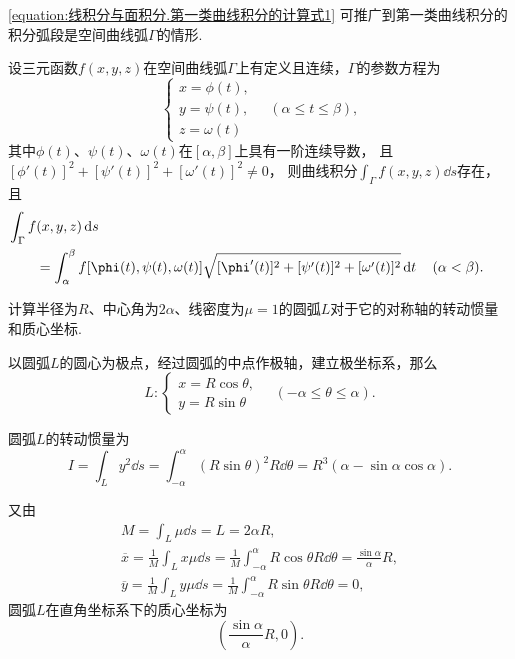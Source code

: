 \cref{equation:线积分与面积分.第一类曲线积分的计算式1} 可推广到第一类曲线积分的积分弧段是空间曲线弧\(\Gamma\)的情形.
\begin{theorem}
设三元函数\(f(x,y,z)\)在空间曲线弧\(\Gamma\)上有定义且连续，\(\Gamma\)的参数方程为\begin{equation*}
	\left\{ \begin{array}{l}
		x = \phi(t), \\
		y = \psi(t), \\
		z = \omega(t)
	\end{array} \right.
	\quad(\alpha \leq t \leq \beta),
\end{equation*}其中\(\phi(t)\)、\(\psi(t)\)、\(\omega(t)\)在\([\alpha,\beta]\)上具有一阶连续导数，
且\([\phi'(t)]^2+[\psi'(t)]^2+[\omega'(t)]^2 \neq 0\)，
则曲线积分\(\int_\Gamma f(x,y,z) \dd{s}\)存在，
且\begin{equation}\label{equation:线积分与面积分.第一类曲线积分的计算式2}
	\begin{aligned}
		&\hspace{-20pt}
		\int_\Gamma f(x,y,z) \dd{s} \\
		&= \int_\alpha^\beta f[\phi(t),\psi(t),\omega(t)] \sqrt{[\phi'(t)]^2+[\psi'(t)]^2+[\omega'(t)]^2} \dd{t}
		\quad(\alpha<\beta).
	\end{aligned}
\end{equation}
\end{theorem}

\begin{example}
计算半径为\(R\)、中心角为\(2\alpha\)、线密度为\(\mu=1\)的圆弧\(L\)对于它的对称轴的转动惯量和质心坐标.
\begin{solution}
以圆弧\(L\)的圆心为极点，经过圆弧的中点作极轴，建立极坐标系，那么\begin{equation*}
	L: \left\{ \begin{array}{l}
		x = R\cos\theta, \\
		y = R\sin\theta
	\end{array} \right.
	\quad(-\alpha\leq\theta\leq\alpha).
\end{equation*}

圆弧\(L\)的转动惯量为\begin{equation*}
	I = \int_L y^2 \dd{s}
	= \int_{-\alpha}^\alpha (R\sin\theta)^2 R\dd{\theta}
	= R^3 (\alpha - \sin\alpha \cos\alpha).
\end{equation*}

又由\begin{gather*}
	M = \int_L \mu \dd{s} = L = 2\alpha R, \\
	\overline{x}
	= \frac{1}{M} \int_L x \mu \dd{s}
	= \frac{1}{M} \int_{-\alpha}^\alpha R\cos\theta R\dd{\theta}
	= \frac{\sin\alpha}{\alpha}R, \\
	\overline{y}
	= \frac{1}{M} \int_L y \mu \dd{s}
	= \frac{1}{M} \int_{-\alpha}^\alpha R\sin\theta R\dd{\theta}
	= 0,
\end{gather*}
圆弧\(L\)在直角坐标系下的质心坐标为\begin{equation*}
	\left(
		\frac{\sin\alpha}{\alpha}R,0
	\right).
\end{equation*}
\end{solution}
\end{example}

